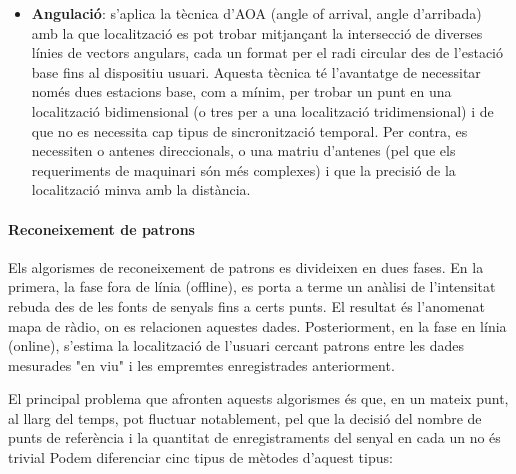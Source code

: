 \begin{itemize}
\begin{itemize}
    \end{itemize}

    \item \textbf{Angulació}: s’aplica la tècnica d’AOA (angle of arrival, angle d'arribada) amb la que localització es pot trobar mitjançant la intersecció de diverses línies de vectors angulars, cada un format per el radi circular des de l'estació base fins al dispositiu usuari. Aquesta tècnica té l'avantatge de necessitar només dues estacions base, com a mínim, per trobar un punt en una localització bidimensional (o tres per a una localització tridimensional) \cite{liu} i de que no es necessita cap tipus de sincronització temporal. Per contra, es necessiten o antenes direccionals, o una matriu d'antenes (pel que els requeriments de maquinari són més complexes) i que la precisió de la localització minva amb la distància.
    
\end{itemize}

\paragraph{Reconeixement de patrons}

Els algorismes de reconeixement de patrons es divideixen en dues fases. En la primera, la fase fora de línia (offline), es porta a terme un anàlisi de l'intensitat rebuda des de les fonts de senyals fins a certs punts. El resultat és l’anomenat mapa de ràdio, on es relacionen aquestes dades. Posteriorment, en la fase en línia (online), s'estima la localització de l'usuari cercant patrons entre les dades mesurades "en viu" i les empremtes enregistrades anteriorment.

El principal problema que afronten aquests algorismes és que, en un mateix punt, al llarg del temps, pot fluctuar notablement, pel que la decisió del nombre de punts de referència i la quantitat de enregistraments del senyal en cada un no és trivial \cite{bagosi}
Podem diferenciar cinc tipus de mètodes d'aquest tipus:

